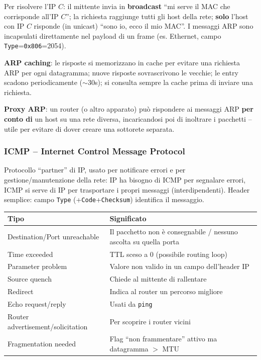 \documentclass[12pt, a4paper]{article}
\begin{document}
\begin{tcolorbox}[colback=lightergray!10, colframe=tocsec, title=\textbf{Meccanismo}]
Per risolvere l'IP $C$: il mittente invia in \textbf{broadcast} ``mi serve il MAC che corrisponde all'IP $C$''; la richiesta raggiunge tutti gli host della rete; \textbf{solo} l'host con IP $C$ risponde (in unicast) ``sono io, ecco il mio MAC''. I messaggi ARP sono incapsulati direttamente nel payload di un frame (es. Ethernet, campo \texttt{Type}=\texttt{0x806}=2054).
\end{tcolorbox}

\textbf{ARP caching}: le risposte si memorizzano in cache per evitare una richiesta ARP per ogni datagramma; nuove risposte sovrascrivono le vecchie; le entry scadono periodicamente ($\sim$30s); si consulta sempre la cache prima di inviare una richiesta.

\textbf{Proxy ARP}: un router (o altro apparato) può rispondere ai messaggi ARP \textbf{per conto di} un host su una rete diversa, incaricandosi poi di inoltrare i pacchetti -- utile per evitare di dover creare una sottorete separata.

\subsubsection{ICMP -- Internet Control Message Protocol}

Protocollo ``partner'' di IP, usato per notificare errori e per gestione/manutenzione della rete: IP ha bisogno di ICMP per segnalare errori, ICMP si serve di IP per trasportare i propri messaggi (interdipendenti). Header semplice: campo \texttt{Type} (+\texttt{Code}+\texttt{Checksum}) identifica il messaggio.

\begin{table}[H]
\centering
\small
\begin{tabular}{ll}
\toprule
\textbf{Tipo} & \textbf{Significato} \\
\midrule
Destination/Port unreachable & Il pacchetto non è consegnabile / nessuno ascolta su quella porta \\
Time exceeded & TTL sceso a 0 (possibile routing loop) \\
Parameter problem & Valore non valido in un campo dell'header IP \\
Source quench & Chiede al mittente di rallentare \\
Redirect & Indica al router un percorso migliore \\
Echo request/reply & Usati da \texttt{ping} \\
Router advertisement/solicitation & Per scoprire i router vicini \\
Fragmentation needed & Flag ``non frammentare'' attivo ma datagramma $>$ MTU \\
\bottomrule
\end{tabular}
\end{table}
\end{document}
